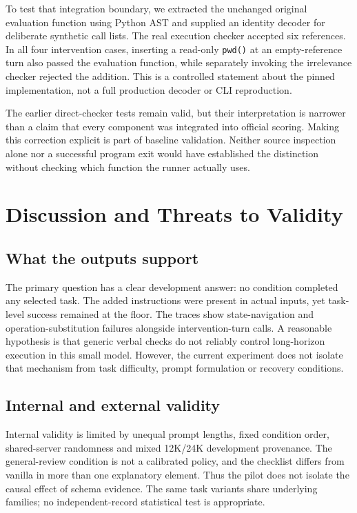 \documentclass[conference]{IEEEtran}
\newcommand{\code}[1]{\texttt{#1}}
\begin{document}
To test that integration boundary, we extracted the unchanged original evaluation function using Python AST and supplied an identity decoder for deliberate synthetic call lists. The real execution checker accepted six references. In all four intervention cases, inserting a read-only \code{pwd()} at an empty-reference turn also passed the evaluation function, while separately invoking the irrelevance checker rejected the addition. This is a controlled statement about the pinned implementation, not a full production decoder or CLI reproduction.

The earlier direct-checker tests remain valid, but their interpretation is narrower than a claim that every component was integrated into official scoring. Making this correction explicit is part of baseline validation. Neither source inspection alone nor a successful program exit would have established the distinction without checking which function the runner actually uses.

\section{Discussion and Threats to Validity}
\subsection{What the outputs support}
The primary question has a clear development answer: no condition completed any selected task. The added instructions were present in actual inputs, yet task-level success remained at the floor. The traces show state-navigation and operation-substitution failures alongside intervention-turn calls. A reasonable hypothesis is that generic verbal checks do not reliably control long-horizon execution in this small model. However, the current experiment does not isolate that mechanism from task difficulty, prompt formulation or recovery conditions.

\subsection{Internal and external validity}
Internal validity is limited by unequal prompt lengths, fixed condition order, shared-server randomness and mixed 12K/24K development provenance. The general-review condition is not a calibrated policy, and the checklist differs from vanilla in more than one explanatory element. Thus the pilot does not isolate the causal effect of schema evidence. The same task variants share underlying families; no independent-record statistical test is appropriate.
\end{document}
